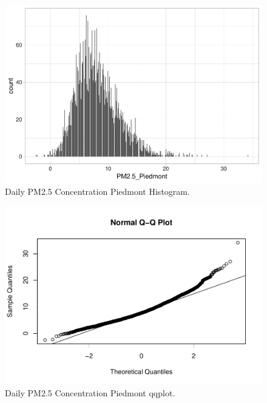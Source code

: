 \documentclass[12pt,]{article}
\begin{document}
\begin{figure}
\centering
\includegraphics{Raby_ENV872_Project_files/figure-latex/unnamed-chunk-44-1.pdf}
\caption{Daily PM2.5 Concentration Piedmont Histogram.
\label{Piedmonthistplot}}
\end{figure}

\begin{figure}
\centering
\includegraphics{Raby_ENV872_Project_files/figure-latex/unnamed-chunk-45-1.pdf}
\caption{Daily PM2.5 Concentration Piedmont qqplot.
\label{Piedmontqqplot}}
\end{figure}
\end{document}
